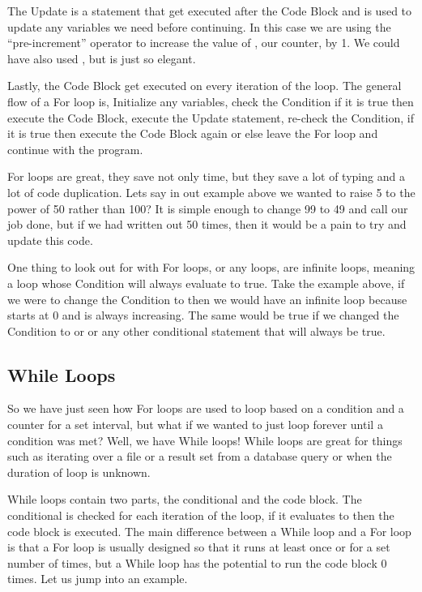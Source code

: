 The Update is a statement that get executed after the Code Block and is used to update any variables we need before continuing.
In this case we are using the ``pre-increment'' operator to increase the value of , our counter, by 1.
We could have also used , but  is just so elegant.
\par

Lastly, the Code Block get executed on every iteration of the loop.
The general flow of a For loop is, Initialize any variables, check the Condition if it is true then execute the Code Block, execute the Update statement, re-check the Condition, if it is true then execute the Code Block again or else leave the For loop and continue with the program.
\par

For loops are great, they save not only time, but they save a lot of typing and a lot of code duplication.
Lets say in out example above we wanted to raise 5 to the power of 50 rather than 100?
It is simple enough to change 99 to 49 and call our job done, but if we had written out  50 times, then it would be a pain to try and update this code.
\par

One thing to look out for with For loops, or any loops, are infinite loops, meaning a loop whose Condition will always evaluate to true.
Take the example above, if we were to change the Condition to  then we would have an infinite loop because  starts at 0 and is always increasing.
The same would be true if we changed the Condition to  or  or any other conditional statement that will always be true.

\subsection{While Loops}

So we have just seen how For loops are used to loop based on a condition and a counter for a set interval, but what if we wanted to just loop forever until a condition was met?
Well, we have While loops!
While loops are great for things such as iterating over a file or a result set from a database query or when the duration of loop is unknown.
\par

While loops contain two parts, the conditional and the code block.
The conditional is checked for each iteration of the loop, if it evaluates to  then the code block is executed.
The main difference between a While loop and a For loop is that a For loop is usually designed so that it runs at least once or for a set number of times,
but a While loop has the potential to run the code block 0 times.
Let us jump into an example.

